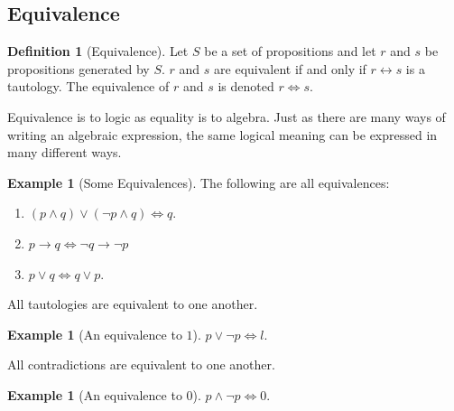 \documentclass[10pt,]{book}
\theoremstyle{plain}
\theoremstyle{definition}
\newtheorem{definition}[theorem]{Definition}
\theoremstyle{definition}
\theoremstyle{definition}
\newtheorem{example}[theorem]{Example}
\theoremstyle{definition}
\begin{document}
\subsection[Equivalence]{Equivalence}\label{subsection-6}
\begin{definition}[Equivalence]\label{def-equivalence}
\label{notation-8}
 Let \(S\) be a set of propositions and let \(r\) and \(s\) be propositions generated by \(S\). \(r\) and \(s\) are equivalent if and only if \(r\leftrightarrow s\) is a tautology. The equivalence of \(r\) and \(s\) is denoted \(r \iff s\).
%
\end{definition}
Equivalence is to logic as equality is to algebra. Just as there are many ways of writing an algebraic expression, the same logical meaning can be expressed in many different ways.%
\begin{example}[Some Equivalences]\label{ex-some-equivalences.}
The following are all equivalences:%
\par
\leavevmode%
\begin{enumerate}[label=\alph*]
\item\hypertarget{li-83}{} \((p \land q)\lor  (\neg p \land q)\iff q\).%
\item\hypertarget{li-84}{}\(p \to  q \iff \neg q \rightarrow  \neg p\)%
\item\hypertarget{li-85}{}\(p \lor  q \iff q \lor p\).%
\end{enumerate}

%
\end{example}
\par
All tautologies are equivalent to one another.%
\begin{example}[An equivalence to \(1\)]\label{equivalence_to_1}
\(p\lor \neg p\iff l\).%
\end{example}
\par
All contradictions are equivalent to one another.%
\begin{example}[An equivalence to \(0\)]\label{equivalence_to_0}
\(p\land \neg p\iff 0\).%
\end{example}
\typeout{************************************************}
\typeout{************************************************}
\end{document}
